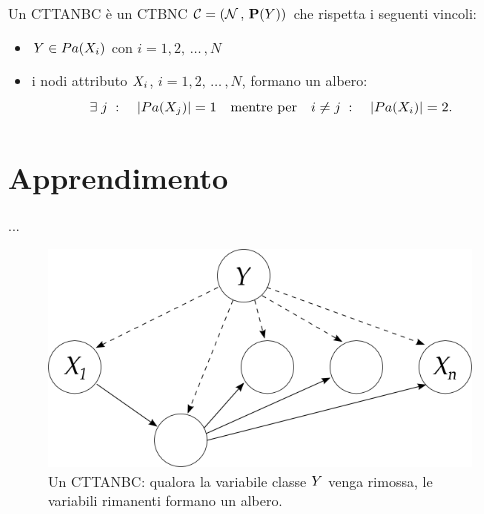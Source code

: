 \begin{definizione}\label{defn:cttanbc}
Un \acf{CTTANBC} è un \acl{CTBNC} $\mathcal{C}=(\mathcal{N}\,,\,\mathbf{P}(\mathnormal{Y}))$ che rispetta i seguenti vincoli:
\begin{itemize}
    \item $\mathnormal{Y} \in Pa(\mathnormal{X}_i)$ con $i=1,2,\,\dotsc\,,N$
    \item i nodi attributo $\mathnormal{X}_i$, $i=1,2,\,\dotsc\,,N$, formano un albero:
    \[
    \exists \; j \; : \quad |Pa(\mathnormal{X}_j)|=1 \quad \text{mentre per} \quad i \neq j \; : \quad |Pa(\mathnormal{X}_i)|=2\text{.}
    \]
\end{itemize}
\end{definizione}


\section{Apprendimento}\label{sec:learning-ctbnc}
...


\begin{figure}
\centering
\includegraphics[width=0.9\columnwidth]{immagini/cttanb}
\caption[Un \acs{CTTANBC}]{Un \acf{CTTANBC}: qualora la variabile classe $\mathnormal{Y}$ venga rimossa, le variabili rimanenti formano un albero.}
\label{fig:cttanb}
\end{figure}

